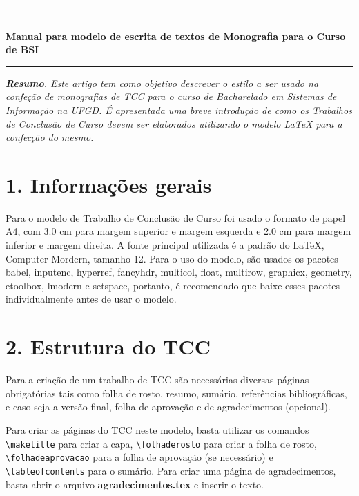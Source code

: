 \documentclass[a4paper, 12pt]{report}
\newcommand{\HRule}{\rule{\linewidth}{0.5mm}}
\begin{document}
  \begin{center}
    \HRule \\[0.5cm]
    \fontsize{12}{16}
    {\Large \bfseries Manual para modelo de escrita de textos de Monografia para o Curso de BSI}
    \HRule
  \end{center}
  \vspace{0.5cm}
  
  {\it {\bfseries Resumo}. Este artigo tem como objetivo descrever o estilo a ser usado na confeção de 
monografias de TCC para o curso de Bacharelado em Sistemas de Informação na UFGD. É apresentada uma breve 
introdução de como os Trabalhos de Conclusão de Curso devem ser elaborados utilizando o modelo LaTeX para a 
confecção do mesmo. }

\section*{1. Informações gerais}

Para o modelo de Trabalho de Conclusão de Curso foi usado o formato de papel A4, com 3.0 cm para margem 
superior e margem esquerda e 2.0 cm para margem inferior e margem 
direita. A fonte principal utilizada é a padrão do LaTeX, Computer Mordern, tamanho 12. Para o uso do 
modelo, são usados os pacotes babel, inputenc, hyperref, fancyhdr, multicol, float, multirow, graphicx, 
geometry, etoolbox, lmodern e setspace, portanto, é recomendado que baixe esses pacotes individualmente 
antes de usar o modelo.

\section*{2. Estrutura do TCC}

Para a criação de um trabalho de TCC são necessárias diversas páginas obrigatórias tais como folha de 
rosto, resumo, sumário, referências bibliográficas, e caso seja a versão final, folha de aprovação e 
de 
agradecimentos (opcional).

Para criar as páginas do TCC neste modelo\cite{MAT14}, basta utilizar os comandos
\lstinline[breaklines=true]!\maketitle! para criar a capa,  
\lstinline[breaklines=true]!\folhaderosto! para criar a folha de rosto, 
\lstinline[breaklines=true]!\folhadeaprovacao! para a folha de aprovação (se necessário) e 
\lstinline[breaklines=true]!\tableofcontents! para o sumário. Para criar uma página de 
agradecimentos, basta abrir o arquivo {\bfseries agradecimentos.tex} e inserir o texto.
\end{document}
